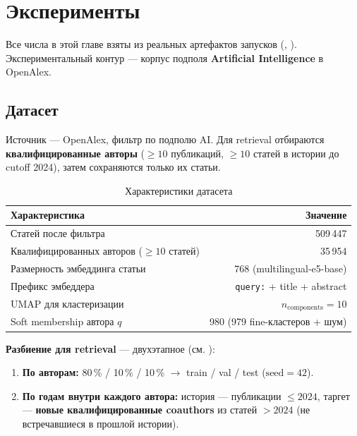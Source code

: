 \newpage
\section{Эксперименты}
\label{ch:experiments}

Все числа в этой главе взяты из реальных артефактов запусков (, ).
Экспериментальный контур — корпус подполя \textbf{Artificial Intelligence} в OpenAlex.

\subsection{Датасет}
\label{sec:dataset}

Источник — OpenAlex, фильтр по подполю AI. Для retrieval отбираются \textbf{квалифицированные авторы}
($\geq 10$ публикаций, $\geq 10$ статей в истории до cutoff 2024), затем сохраняются только их статьи.

\begin{table}[ht]
\caption{Характеристики датасета}
\label{tab:dataset}
\centering
\footnotesize
\begin{tabular}{lr}
\toprule
Характеристика & Значение \\
\midrule
Статей после фильтра & 509\,447 \\
Квалифицированных авторов ($\geq 10$ статей) & 35\,954 \\
Размерность эмбеддинга статьи & 768 (multilingual-e5-base) \\
Префикс эмбеддера & \texttt{query:} + title + abstract \\
UMAP для кластеризации & $n_{\mathrm{components}} = 10$ \\
Soft membership автора $q$ & 980 (979 fine-кластеров + шум) \\
\bottomrule
\end{tabular}
\end{table}

\textbf{Разбиение для retrieval} — двухэтапное (см. ):

\begin{enumerate}
  \item \textbf{По авторам:} 80\,\% / 10\,\% / 10\,\% $\to$ train / val / test ($\mathrm{seed} = 42$).
  \item \textbf{По годам внутри каждого автора:} история — публикации $\leq 2024$, таргет —
        \textbf{новые квалифицированные coauthors} из статей $> 2024$ (не встречавшиеся в прошлой
        истории).
\end{enumerate}

